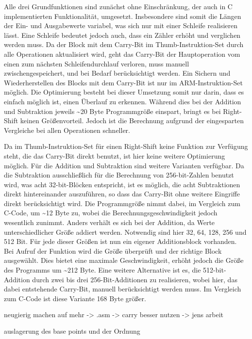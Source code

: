 Alle drei Grundfunktionen sind zunächst ohne Einschränkung, der auch in C implementierten Funktionalität, umgesetzt. Insbesondere sind somit
die Längen der Ein- und Ausgabewerte variabel, was sich nur mit einer Schleife realisieren lässt. Eine Schleife bedeutet jedoch auch, dass
ein Zähler erhöht und verglichen werden muss. Da der Block mit dem Carry-Bit im Thumb-Instruktion-Set durch alle Operationen aktualisiert wird,
geht das Carry-Bit der Hauptoperation vom einen zum nächsten Schleifendurchlauf verloren, muss manuell zwischengespeichert, und bei Bedarf
berücksichtigt werden. Ein Sichern und Wiederherstellen des Blocks mit dem Carry-Bit ist nur im ARM-Instruktion-Set möglich.
Die Optimierung besteht bei dieser Umsetzung somit nur darin, dass es einfach möglich ist, einen Überlauf zu erkennen.
Während dies bei der Addition und Subtraktion jeweils \textasciitilde 20 Byte Programmgröße einspart, bringt es bei Right-Shift
keinen Größenvorteil. Jedoch ist die Berechnung aufgrund der eingesparten Vergleiche bei allen Operationen schneller.

Da im Thumb-Instruktion-Set für einen Right-Shift keine Funktion zur Verfügung steht, die das Carry-Bit direkt benutzt, ist hier keine weitere Optimierung möglich.
Für die Addition und Subtraktion sind weitere Varianten verfügbar. Da die Subtraktion ausschließlich für die Berechnung von 256-bit-Zahlen benutzt wird,
was acht 32-bit-Blöcken entspricht, ist es möglich, die acht Subtraktionen direkt hintereinander auszuführen, so dass das Carry-Bit ohne weitere
Eingriffe direkt berücksichtigt wird. Die Programmgröße nimmt dabei, im Vergleich zum C-Code, um \textasciitilde 12 Byte zu, wobei die
Berechnungsgeschwindigkeit jedoch wesentlich zunimmt. Anders verhält es sich bei der Addition, da Werte unterschiedlicher Größe addiert werden.
Notwendig sind hier 32, 64, 128, 256 und 512 Bit. Für jede dieser Größen ist nun ein eigener Additionsblock vorhanden. Bei Aufruf der Funktion wird
die Größe überprüft und der richtige Block ausgewählt. Dies bietet eine maximale Geschwindigkeit, erhöht jedoch die Größe des Programms um \textasciitilde 212 Byte.
Eine weitere Alternative ist es, die 512-bit-Addition durch zwei bis drei 256-Bit-Additionen zu realisieren, wobei hier, das dabei entstehende Carry-Bit, manuell
berücksichtigt werden muss. Im Vergleich zum C-Code ist diese Variante 168 Byte größer.

neugierig machen auf mehr -> .asm -> carry besser nutzen -> jens arbeit

auslagerung des base points und der Ordnung